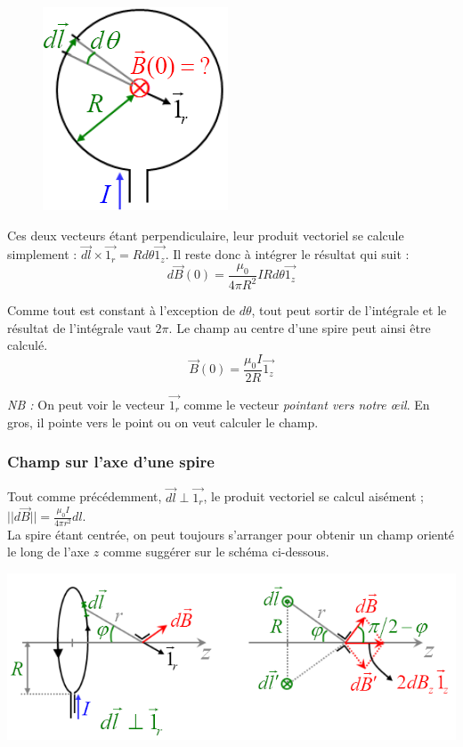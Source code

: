 \documentclass	[11pt, a4paper, openany]{book}
\begin{document}
\begin{figure}
\includegraphics[scale=0.55]{magneto/image8.png}
\end{figure}


Ces deux vecteurs étant perpendiculaire, leur produit vectoriel se calcule simplement : $\vec{dl} \times \vec{1_r} = Rd\theta\vec{1_z}$. Il reste donc à intégrer le résultat qui suit :
\begin{equation}
d\vec{B}(0) = \frac{\mu_0}{4\pi R^2}IRd\theta\vec{1_z}
\end{equation}

Comme tout est constant à l'exception de $d\theta$, tout peut sortir de l'intégrale et le résultat de l'intégrale vaut $2\pi$. Le champ au centre d'une spire peut ainsi être calculé.
\begin{equation}
\vec{B}(0) = \frac{\mu_0 I}{2R}\vec{1_z}
\end{equation}

\textit{NB :} On peut voir le vecteur $\vec{1_r}$ comme le vecteur \textit{pointant vers  notre œil}. En gros, il pointe vers le point ou on veut calculer le champ.

\subsubsection{Champ sur l'axe d'une spire}
Tout comme précédemment, $\vec{dl} \perp \vec{1_r}$, le produit vectoriel se calcul aisément ; $||d\vec{B}|| = \frac{\mu_0 I}{4\pi r^2}dl$.\\
La spire étant centrée, on peut toujours s'arranger pour obtenir un champ orienté le long de l'axe $z$ comme suggérer sur le schéma ci-dessous.

\begin{center}
\includegraphics[scale=0.70]{magneto/image9.png}
\end{center}
\end{document}
